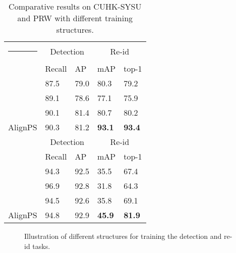 \documentclass[journal]{IEEEtran}
\makeatletter
\newcommand{\thickhline}{\noalign {\ifnum 0=`}\fi \hrule height 1pt
    \futurelet \reserved@a \@xhline
}
\makeatother
\begin{document}
\begin{table}[t]
\small
\centering
\begin{tabular}{p{1.9cm}|p{1.1cm}<{\centering}p{1.1cm}<{\centering}|p{1.1cm}<{\centering}p{1.1cm}<{\centering}}
\hline\thickhline
\rowcolor{mygray} 
  & \multicolumn{2}{c|}{Detection} & \multicolumn{2}{c}{Re-id}   \\ \cline{2-5} 
\rowcolor{mygray} 
\multirow{-2}{*}{CUHK-SYSU}  & Recall & AP  & mAP  & top-1  \\  \hline \hline     

   & 87.5   & 79.0       & 80.3   & 79.2   \\
  & 89.1   & 78.6      & 77.1   & 75.9    \\ 
  & 90.1   & 81.4       & 80.7   & 80.2  \\
AlignPS  & 90.3    & 81.2 &\textbf{93.1} & \textbf{93.4}\\\hline \hline
\rowcolor{mygray} 
  & \multicolumn{2}{c|}{Detection} & \multicolumn{2}{c}{Re-id}   \\ \cline{2-5} 
\rowcolor{mygray} 
\multirow{-2}{*}{PRW}  & Recall & AP  & mAP  & top-1  \\  \hline \hline        

   &  94.3   &  92.5       & 35.5   & 67.4   \\
  & 96.9     & 92.8     & 31.8   & 64.3    \\ 
  &  94.5  &  92.6     & 35.8   & 69.1\\
AlignPS  &  94.8   & 92.9  &\textbf{45.9} & \textbf{81.9}\\\hline
\end{tabular}
\caption{Comparative results on CUHK-SYSU and PRW with different training structures. }
\label{tab:tasks}
\end{table}

\begin{figure}[t]
\vspace{-5mm}
\centering
{}
 \hfill
{}
 \hfill
{}
 \hfill
{}
 \caption{Illustration of different structures for training the detection and re-id tasks.}
 \label{fig:tasks}
\end{figure}
\end{document}

